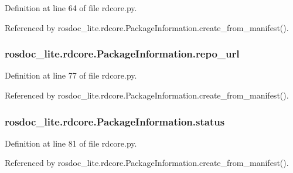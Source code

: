 Definition at line 64 of file rdcore.\+py.



Referenced by rosdoc\+\_\+lite.\+rdcore.\+Package\+Information.\+create\+\_\+from\+\_\+manifest().

\subsubsection[{\texorpdfstring{repo\+\_\+url}{repo_url}}]{\setlength{\rightskip}{0pt plus 5cm}rosdoc\+\_\+lite.\+rdcore.\+Package\+Information.\+repo\+\_\+url}\hypertarget{classrosdoc__lite_1_1rdcore_1_1PackageInformation_a5a276ff51a0190a30dc47b1f68573718}{}\label{classrosdoc__lite_1_1rdcore_1_1PackageInformation_a5a276ff51a0190a30dc47b1f68573718}


Definition at line 77 of file rdcore.\+py.



Referenced by rosdoc\+\_\+lite.\+rdcore.\+Package\+Information.\+create\+\_\+from\+\_\+manifest().

\subsubsection[{\texorpdfstring{status}{status}}]{\setlength{\rightskip}{0pt plus 5cm}rosdoc\+\_\+lite.\+rdcore.\+Package\+Information.\+status}\hypertarget{classrosdoc__lite_1_1rdcore_1_1PackageInformation_a0e5a0d40d1d31760edff0121a6ce2c7f}{}\label{classrosdoc__lite_1_1rdcore_1_1PackageInformation_a0e5a0d40d1d31760edff0121a6ce2c7f}


Definition at line 81 of file rdcore.\+py.



Referenced by rosdoc\+\_\+lite.\+rdcore.\+Package\+Information.\+create\+\_\+from\+\_\+manifest().

